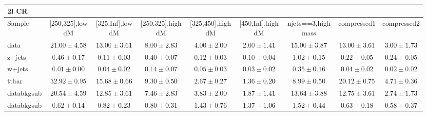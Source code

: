 \begin{table}
\begin{center}
\small
\begin{tabular}{lcccccccc}
\hline
2l CR & & & & & & & &\\
\hline
Sample&[250,325],low dM&[325,Inf],low dM&[250,325],high dM&[325,450],high dM&[450,Inf],high dM&njets==3,high mass&compressed1&compressed2\\
\hline
data&$21.00\pm4.58$&$13.00\pm3.61$&$8.00\pm2.83$&$4.00\pm2.00$&$2.00\pm1.41$&$15.00\pm3.87$&$13.00\pm3.61$&$3.00\pm1.73$\\
\hline
z+jets&$0.46\pm0.17$&$0.11\pm0.03$&$0.40\pm0.07$&$0.12\pm0.03$&$0.10\pm0.04$&$1.02\pm0.15$&$0.22\pm0.05$&$0.24\pm0.05$\\
w+jets&$0.01\pm0.00$&$0.04\pm0.02$&$0.14\pm0.07$&$0.05\pm0.03$&$0.03\pm0.02$&$0.35\pm0.16$&$0.04\pm0.02$&$0.02\pm0.02$\\
ttbar&$32.92\pm0.95$&$15.68\pm0.66$&$9.30\pm0.50$&$2.67\pm0.27$&$1.36\pm0.20$&$8.99\pm0.50$&$20.12\pm0.75$&$4.71\pm0.36$\\
databkgsub&$20.54\pm4.59$&$12.85\pm3.61$&$7.46\pm2.83$&$3.83\pm2.00$&$1.87\pm1.41$&$13.64\pm3.88$&$12.75\pm3.61$&$2.74\pm1.73$\\
databkgsub&$0.62\pm0.14$&$0.82\pm0.23$&$0.80\pm0.31$&$1.43\pm0.76$&$1.37\pm1.06$&$1.52\pm0.44$&$0.63\pm0.18$&$0.58\pm0.37$\\
\hline\hline
\end{tabular}
\end{center}
\end{table}
